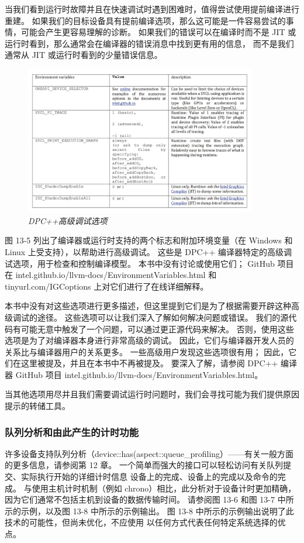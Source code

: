 当我们看到运行时故障并且在快速调试时遇到困难时，值得尝试使用提前编译进行重建。 
如果我们的目标设备具有提前编译选项，那么这可能是一件容易尝试的事情，可能会产生更容易理解的诊断。 
如果我们的错误可以在编译时而不是 JIT 或运行时看到，那么通常会在编译器的错误消息中找到更有用的信息，
而不是我们通常从 JIT 或运行时看到的少量错误信息。

\begin{figure}[H]
	\centering
	\includegraphics[width=0.9\textwidth]{figs/F13.5.png}
	\caption{\textit{DPC++高级调试选项 }}
\end{figure}

图 13-5 列出了编译器或运行时支持的两个标志和附加环境变量（在 Windows 和 Linux 上受支持），以帮助进行高级调试。 
这些是 DPC++ 编译器特定的高级调试选项，用于检查和控制编译模型。 
本书中没有讨论或使用它们； 
GitHub 项目在 intel.github.io/llvm-docs/EnvironmentVariables.html 
和tinyurl.com/IGCoptions 上对它们进行了在线详细解释。

本书中没有对这些选项进行更多描述，但这里提到它们是为了根据需要开辟这种高级调试的途径。 
这些选项可以让我们深入了解如何解决问题或错误。 我们的源代码有可能无意中触发了一个问题，可以通过更正源代码来解决。 
否则，使用这些选项是为了对编译器本身进行非常高级的调试。 
因此，它们与编译器开发人员的关系比与编译器用户的关系更多。 
一些高级用户发现这些选项很有用； 因此，它们在这里被提及，并且在本书中不再被提及。 
要深入了解，请参阅 DPC++ 编译器 GitHub 项目 intel.github.io/llvm-docs/EnvironmentVariables.html。

\begin{remark}[调试提示]
当其他选项用尽并且我们需要调试运行时问题时，我们会寻找可能为我们提供原因提示的转储工具。
\end{remark}

\subsubsection{队列分析和由此产生的计时功能}
许多设备支持队列分析（device::has(aspect::queue\_profiling）——有关一般方面的更多信息，请参阅第 12 章。
一个简单而强大的接口可以轻松访问有关队列提交、实际执行开始的详细计时信息 设备上的完成、设备上的完成以及命令的完成。
与使用主机计时机制（例如 chrono）相比，此分析对于设备计时更加精确，因为它们通常不包括主机到设备的数据传输时间。 
请参阅图 13-6 和图 13-7 中所示的示例，以及图 13-8 中所示的示例输出。
图 13-8 中所示的示例输出说明了此技术的可能性，但尚未优化，不应使用 以任何方式代表任何特定系统选择的优点。

